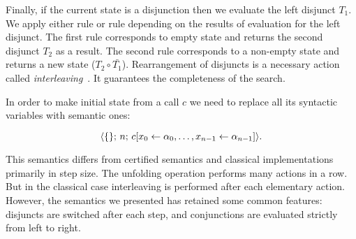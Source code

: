 Finally, if the current state is a disjunction then we evaluate the left disjunct $T_1$. We apply either rule  or rule  depending
on the results of evaluation for the left disjunct. The first rule corresponds to empty state and returns the second disjunct $T_2$ as a result. The second rule corresponds
to a non-empty state and returns a new state ($T_2 \circ \bar{T_1}$). Rearrangement of disjuncts is a necessary action called \emph{interleaving}~\cite{fair:interleaving}.
It guarantees the completeness of the search.

In order to make initial state from a call $c$ we need to replace all its syntactic variables with semantic ones:

\[
\langle \{\};\, n;\, c[x_0 \leftarrow \alpha_0, \ldots, x_{n-1} \leftarrow \alpha_{n-1}] \rangle.
\]

This semantics differs from certified semantics and classical implementations primarily in step size. The unfolding operation performs many actions in a row.
But in the classical case interleaving is performed after each elementary action. However, the semantics we presented has retained some common features: disjuncts are switched 
after each step, and conjunctions are evaluated strictly from left to right. 


